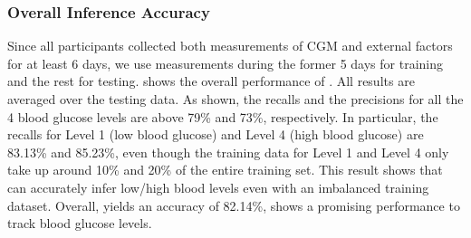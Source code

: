 \subsubsection{Overall Inference Accuracy}
Since all participants collected both measurements of CGM and external factors for at least 6 days, we use measurements during the former 5 days for training and the rest for testing.
 shows the overall performance of \sysname.
All results are averaged over the testing data.
As shown, the recalls and the precisions for all the 4 blood glucose levels are above 79\% and 73\%, respectively.
In particular, the recalls for Level 1 (low blood glucose) and Level 4 (high blood glucose) are 83.13\% and 85.23\%, even though the training data for Level 1 and Level 4 only take up around 10\% and 20\% of the entire training set.
This result shows that \sysname can accurately infer low/high blood levels even with an imbalanced training dataset.
Overall, \sysname yields an accuracy of 82.14\%, shows a promising performance to track blood glucose levels.

